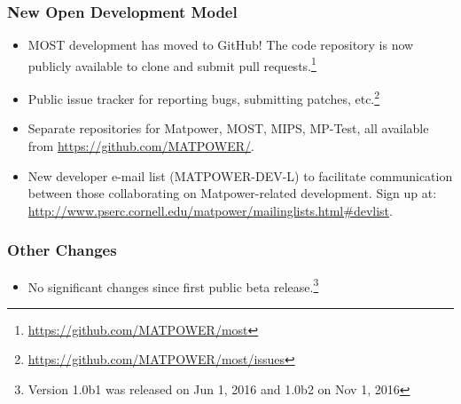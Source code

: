 \documentclass[12pt]{article}
\newcommand{\matpower}[0]{{\sc Matpower}}
\newcommand{\mptest}[0]{{MP-Test}}
\newcommand{\mips}[0]{{MIPS}}
\newcommand{\most}[0]{{MOST}}
\numberwithin{equation}{section}
\numberwithin{table}{section}
\numberwithin{figure}{section}
\begin{document}
\begin{appendices}
\subsubsection*{New Open Development Model}
\begin{itemize}
\item \most{} development has moved to GitHub! The code repository is now publicly available to clone and submit pull requests.\footnote{\url{https://github.com/MATPOWER/most}}
\item Public issue tracker for reporting bugs, submitting patches, etc.\footnote{\url{https://github.com/MATPOWER/most/issues}}
\item Separate repositories for \matpower{}, \most{}, \mips{}, \mptest{}, all available from \url{https://github.com/MATPOWER/}.
\item New developer e-mail list (MATPOWER-DEV-L) to facilitate communication between those collaborating on \matpower{}-related development. Sign up at:\\
\url{http://www.pserc.cornell.edu/matpower/mailinglists.html#devlist}.
\end{itemize}

\subsubsection*{Other Changes}
\begin{itemize}
\item No significant changes since first public beta release.\footnote{Version 1.0b1 was released on Jun 1, 2016 and 1.0b2 on Nov 1, 2016}
\end{itemize}

\end{appendices}
\end{document}
